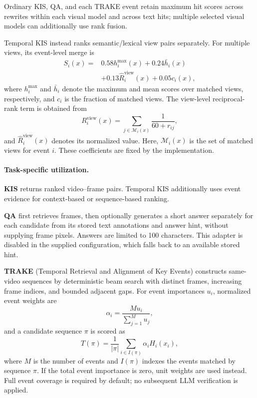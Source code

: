 \documentclass[11pt]{article}
\begin{document}
Ordinary KIS, QA, and each TRAKE event retain maximum hit scores
across rewrites within each visual model and across text hits;
multiple selected visual models can additionally use rank fusion.

Temporal KIS instead ranks semantic/lexical view pairs separately.
For multiple views, its event-level merge is
\begin{equation}
\begin{aligned}
S_i(x) ={}&
0.58 h_i^{\max}(x)
+ 0.24 \bar{h}_i(x) \\
&+ 0.13 \widehat{R}^{\mathrm{view}}_i(x)
+ 0.05 c_i(x),
\end{aligned}
\label{eq:temporal_kis_score}
\end{equation}
where $h_i^{\max}$ and $\bar{h}_i$ denote the maximum and mean scores
over matched views, respectively, and $c_i$ is the fraction of
matched views. The view-level reciprocal-rank term is obtained from
\begin{equation}
R^{\mathrm{view}}_i(x)
=
\sum_{j \in \mathcal{M}_i(x)}
\frac{1}{60+r_{ij}},
\label{eq:view_rrf}
\end{equation}
and $\widehat{R}^{\mathrm{view}}_i(x)$ denotes its normalized value.
Here, $\mathcal{M}_i(x)$ is the set of matched views for event $i$.
These coefficients are fixed by the implementation.

\paragraph{Task-specific utilization.}
\textbf{KIS} returns ranked video--frame pairs. Temporal KIS
additionally uses event evidence for context-based or sequence-based
ranking.

\textbf{QA} first retrieves frames, then optionally generates a short
answer separately for each candidate from its stored text annotations
and answer hint, without supplying frame pixels. Answers are limited
to 100 characters. This adapter is disabled in the supplied
configuration, which falls back to an available stored hint.

\textbf{TRAKE} (Temporal Retrieval and Alignment of Key Events)
constructs same-video sequences by deterministic beam search with
distinct frames, increasing frame indices, and bounded adjacent gaps.
For event importances $u_i$, normalized event weights are
\begin{equation}
\alpha_i
=
\frac{M u_i}
{\sum_{j=1}^{M} u_j},
\label{eq:trake_weight}
\end{equation}
and a candidate sequence $\pi$ is scored as
\begin{equation}
T(\pi)
=
\frac{1}{\lvert\pi\rvert}
\sum_{i \in I(\pi)}
\alpha_i H_i(x_i),
\label{eq:trake_score}
\end{equation}
where $M$ is the number of events and $I(\pi)$ indexes the events
matched by sequence $\pi$. If the total event importance is zero,
unit weights are used instead. Full event coverage is required by
default; no subsequent LLM verification is applied.
\end{document}
